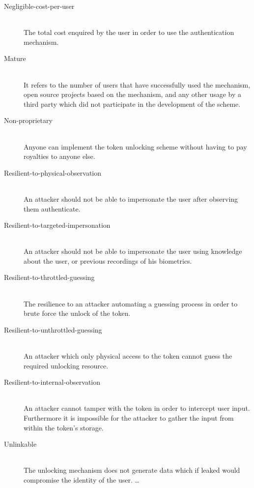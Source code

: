 \begin{description}
  \item[Negligible-cost-per-user] \hfill \\
  The total cost enquired by the user in order to use the authentication mechanism.
  
  \item[Mature] \hfill \\
  It refers to the number of users that have successfully used the mechanism, open source projects based on the mechanism, and any other usage by a third party which did not participate in the development of the scheme.
  
  \item[Non-proprietary] \hfill \\
  Anyone can implement the token unlocking scheme without having to pay royalties to anyone else.
  
  \item[Resilient-to-physical-observation] \hfill \\
  An attacker should not be able to impersonate the user after observing them authenticate.
  
  \item[Resilient-to-targeted-impersonation] \hfill \\
  An attacker should not be able to impersonate the user using knowledge about the user, or previous recordings of his biometrics.
  
  \item[Resilient-to-throttled-guessing] \hfill \\
  The resilience to an attacker automating a guessing process in order to brute force the unlock of the token.
  
  \item[Resilient-to-unthrottled-guessing] \hfill \\
  An attacker which only physical access to the token cannot guess the required unlocking resource.
  
  \item[Resilient-to-internal-observation] \hfill \\
  An attacker cannot tamper with the token in order to intercept user input. Furthermore it is impossible for the attacker to gather the input from within the token's storage.
  
  \item[Unlinkable] \hfill \\
  The unlocking mechanism does not generate data which if leaked would compromise the identity of the user. \ldots
  
\end{description}


